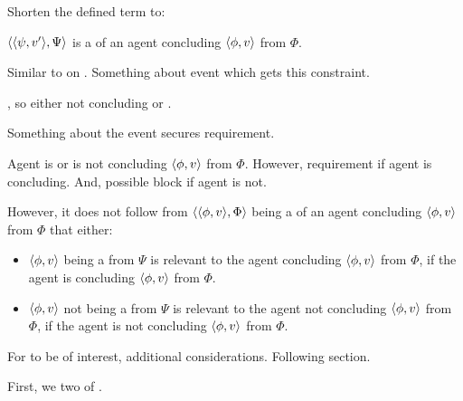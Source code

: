\begin{note}
  \noindent%
  Shorten the defined term to:
  \begin{notation}
  \item
    \(\langle \langle \psi, v' \rangle, \Psi \rangle\) is a \requ{} of an agent concluding \(\langle \phi, v \rangle\) from \(\Phi\).
  \end{notation}
\end{note}

\begin{note}
  Similar to \qWhyV{} on .
  Something about event which gets this constraint.

  , so either not concluding or \fc{}.

  Something about the event secures requirement.

  Agent is or is not concluding \(\langle \phi, v \rangle\) from \(\Phi\).
  However, requirement if agent is concluding.
  And, possible block if agent is not.

  However, it does not follow from \(\langle \langle \phi, v \rangle, \Phi \rangle\) being a \requ{} of an agent concluding \(\langle \phi, v \rangle\) from \(\Phi\) that either:
  \begin{itemize}
  \item
    \(\langle \phi, v \rangle\) being a \fc{} from \(\Psi\) is relevant to the agent concluding \(\langle \phi, v \rangle\) from \(\Phi\), if the agent is concluding \(\langle \phi, v \rangle\) from \(\Phi\).
  \item
    \(\langle \phi, v \rangle\) not being a \fc{} from \(\Psi\) is relevant to the agent not concluding \(\langle \phi, v \rangle\) from \(\Phi\), if the agent is not concluding \(\langle \phi, v \rangle\) from \(\Phi\).
  \end{itemize}

  For \requ{} to be of interest, additional considerations.
  Following section.

  First, we two  of .
\end{note}

\paragraph*{}

